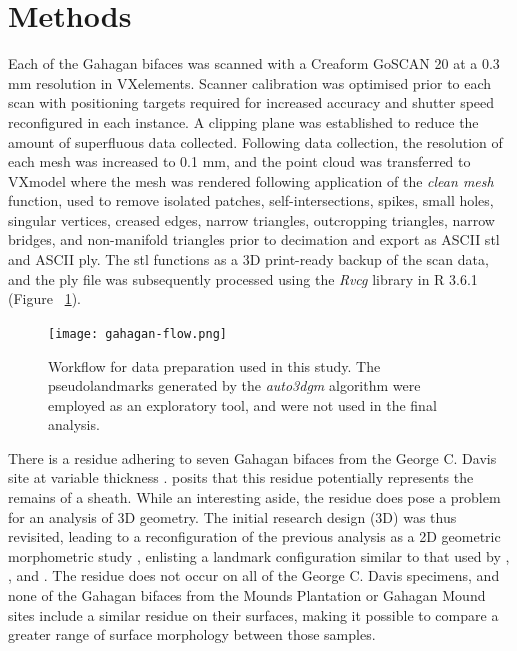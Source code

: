 \documentclass[review]{elsarticle}
\begin{document}
\section*{Methods}

Each of the Gahagan bifaces was scanned with a Creaform GoSCAN 20 at a 0.3 mm resolution in VXelements. Scanner calibration was optimised prior to each scan with positioning targets required for increased accuracy and shutter speed reconfigured in each instance. A clipping plane was established to reduce the amount of superfluous data collected. Following data collection, the resolution of each mesh was increased to 0.1 mm, and the point cloud was transferred to VXmodel where the mesh was rendered following application of the \textit{clean mesh} function, used to remove isolated patches, self-intersections, spikes, small holes, singular vertices, creased edges, narrow triangles, outcropping triangles, narrow bridges, and non-manifold triangles prior to decimation and export as ASCII stl and ASCII ply. The stl functions as a 3D print-ready backup of the scan data, and the ply file was subsequently processed using the \textit{Rvcg} library in R 3.6.1 \citep{RN20849,R,RN20850} (Figure ~\ref{fig:figflow}).

\begin{figure}[ht!]\centering
\texttt{[image: gahagan-flow.png]}
\caption{Workflow for data preparation used in this study. The pseudolandmarks generated by the \textit{auto3dgm} algorithm were employed as an exploratory tool, and were not used in the final analysis.}
\label{fig:figflow}
\end{figure}

There is a residue adhering to seven Gahagan bifaces from the George C. Davis site at variable thickness \citep[Figure 2]{RN11783}. \citet[228]{RN3684} posits that this residue potentially represents the remains of a sheath. While an interesting aside, the residue does pose a problem for an analysis of 3D geometry. The initial research design (3D) was thus revisited, leading to a reconfiguration of the previous analysis as a 2D geometric morphometric study \citep{RN11783}, enlisting a landmark configuration similar to that used by \citet[Figure 2]{RN1754}, \citet[Figure 2]{RN1736}, and \citet[Figure 1]{RN11731}. The residue does not occur on all of the George C. Davis specimens, and none of the Gahagan bifaces from the Mounds Plantation or Gahagan Mound sites include a similar residue on their surfaces, making it possible to compare a greater range of surface morphology between those samples. 
\end{document}
